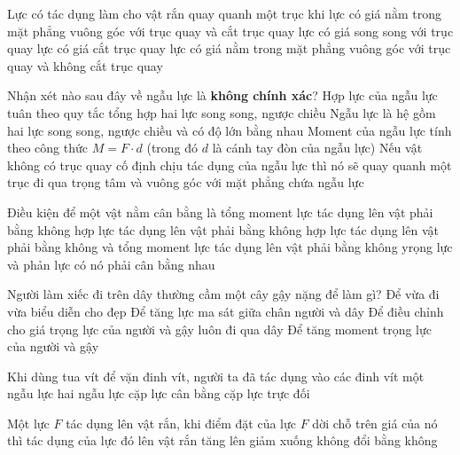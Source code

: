 \begin{ex}
	Lực có tác dụng làm cho vật rắn quay quanh một trục khi
	\choice
	{lực có giá nằm trong mặt phẳng vuông góc với trục quay và cắt trục quay}
	{lực có giá song song với trục quay}
	{lực có giá cắt trục quay}
	{\True lực có giá nằm trong mặt phẳng vuông góc với trục quay và không cắt trục quay}
	\loigiai{}
\end{ex}
\begin{ex}
	Nhận xét nào sau đây về ngẫu lực là \textbf{không chính xác}?
	\choice
	{\True Hợp lực của ngẫu lực tuân theo quy tắc tổng hợp hai lực song song, ngược chiều}
	{Ngẫu lực là hệ gồm hai lực song song, ngược chiều và có độ lớn bằng nhau}
	{Moment của ngẫu lực tính theo công thức $M=F\cdot d$ (trong đó $d$ là cánh tay đòn của ngẫu lực)}
	{Nếu vật không có trục quay cố định chịu tác dụng của ngẫu lực thì nó sẽ quay quanh một trục đi qua trọng tâm và vuông góc với mặt phẳng chứa ngẫu lực}
\end{ex}
\begin{ex}
	Điều kiện để một vật nằm cân bằng là
	\choice
	{tổng moment lực tác dụng lên vật phải bằng không}
	{hợp lực tác dụng lên vật phải bằng không}
	{\True hợp lực tác dụng lên vật phải bằng không và tổng moment lực tác dụng lên vật phải bằng không}
	{yrọng lực và phản lực có nó phải cân bằng nhau}
	\loigiai{}
\end{ex}
\begin{ex}
	Người làm xiếc đi trên dây thường cầm một cây gậy nặng để làm gì?
	\choice
	{Để vừa đi vừa biểu diễn cho đẹp}
	{Để tăng lực ma sát giữa chân người và dây}
	{\True Để điều chỉnh cho giá trọng lực của người và gậy luôn đi qua dây}
	{Để tăng moment trọng lực của người và gậy}
	\loigiai{}
\end{ex}
\begin{ex}
Khi dùng tua vít để vặn đinh vít, người ta đã tác dụng vào các đinh vít	
	\choice
	{\True một ngẫu lực}
	{hai ngẫu lực}
	{cặp lực cân bằng}
	{cặp lực trực đối}
	\loigiai{}
\end{ex}
\begin{ex}
Một lực $F$ tác dụng lên vật rắn, khi điểm đặt của lực $F$ dời chỗ trên giá của nó thì tác dụng của lực đó lên vật rắn	
	\choice
	{tăng lên}
	{giảm xuống}
	{\True không đổi}
	{bằng không}
	\loigiai{}
\end{ex}
